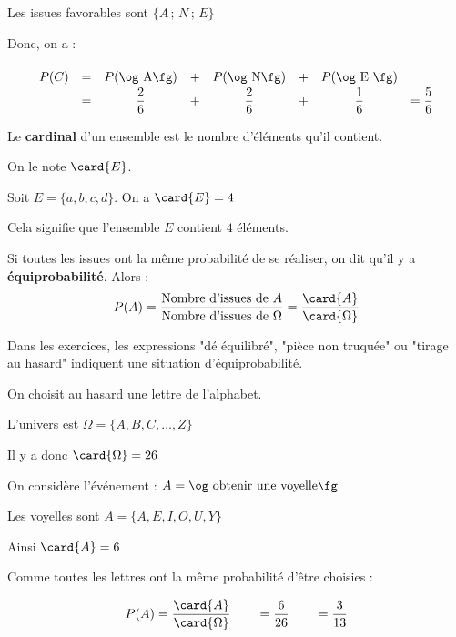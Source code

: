 Les issues favorables sont $\{A\,;\,N\,;\,E\}$

Donc, on a :

$$
	\def\arraystretch{1.5}
	\begin{array}{rccccccc}
		P(C) & = & P(\text{\og A\fg}) & + & P(\text{\og N\fg}) & + & P(\text{\og E \fg}) &               \\
		     & = & \dfrac{2}{6}       & + & \dfrac{2}{6}       & + & \dfrac{1}{6}        & =\dfrac{5}{6} \\
	\end{array}
$$


Le \textbf{cardinal} d'un ensemble est le nombre d'éléments qu'il contient.

On le note $\card{E}$.

\ex

Soit $E=\{a,b,c,d\}$. On a $\card{E}=4$

Cela signifie que l'ensemble $E$ contient $4$ éléments.

\prop [Équiprobabilité]

Si toutes les issues ont la même probabilité de se réaliser, on dit qu'il y a \textbf{équiprobabilité}. Alors :
$$ P(A) = \frac{\text{Nombre d'issues de } A}{\text{Nombre d'issues de } \Omega} = \frac{\card{A}}{\card{\Omega}} $$

\rem

Dans les exercices, les expressions "dé équilibré", "pièce non truquée" ou "tirage au hasard" indiquent une situation d'équiprobabilité.


On choisit au hasard une lettre de l'alphabet.

L'univers est $\Omega=\{A,B,C,\dots,Z\}$

\begin{marginfigure}\end{marginfigure}

Il y a donc $\card{\Omega}=26$

On considère l'événement : $A=\text{\og obtenir une voyelle\fg}$

Les voyelles sont $A=\{A,E,I,O,U,Y\}$

Ainsi $\card{A}=6$

Comme toutes les lettres ont la même probabilité d'être choisies :

$$P(A) = \dfrac{\card{A}}{\card{\Omega}}\qquad = \dfrac{6}{26}\qquad = \dfrac{3}{13}$$



